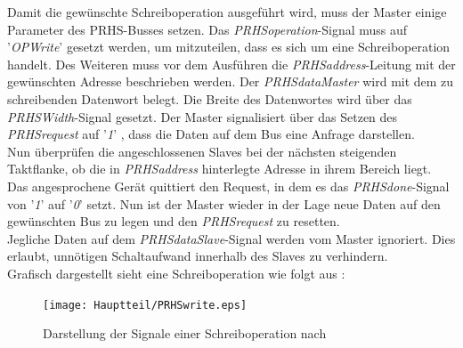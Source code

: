 Damit die gewünschte Schreiboperation ausgeführt wird,
muss der Master einige Parameter des PRHS-Busses setzen. Das \emph{PRHSoperation}-Signal muss
auf  '\emph{OPWrite}' gesetzt werden, um mitzuteilen, dass
es sich um eine Schreiboperation handelt. Des Weiteren muss vor dem Ausführen die
\emph{PRHSaddress}-Leitung mit der gewünschten Adresse beschrieben werden. Der
\emph{PRHSdataMaster} wird mit dem zu schreibenden Datenwort belegt. Die Breite des
Datenwortes wird über das \emph{PRHSWidth}-Signal gesetzt. Der Master signalisiert
über das Setzen des \emph{PRHSrequest} auf '\emph{1}' , dass die Daten auf dem Bus eine
Anfrage darstellen.\\
Nun überprüfen die angeschlossenen Slaves bei der nächsten steigenden Taktflanke, ob
die in \emph{PRHSaddress} hinterlegte Adresse in ihrem Bereich liegt. Das angesprochene
Gerät quittiert den Request, in dem es das \emph{PRHSdone}-Signal von '\emph{1}' auf '\emph{0}' setzt.
Nun ist der Master wieder in der Lage neue Daten auf den gewünschten
Bus zu legen und den \emph{PRHSrequest} zu resetten.\\
Jegliche Daten auf dem \emph{PRHSdataSlave}-Signal werden vom Master ignoriert.
Dies erlaubt, unnötigen Schaltaufwand innerhalb des Slaves zu verhindern.\cite{MEckertDiss}\\
\newpage
Grafisch dargestellt sieht eine Schreiboperation wie folgt aus :\\

\begin{figure}[h]
\centering
\texttt{[image: Hauptteil/PRHSwrite.eps]}
\caption{Darstellung der Signale einer Schreiboperation nach \cite{MEckertDiss}}
\label{fig:PRHSBUS}
\end{figure}

